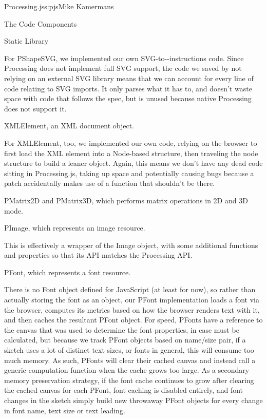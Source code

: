 \begin{aosachapter}{Processing.js}{s:pjs}{Mike Kamermans}
\begin{aosasect1}{The Code Components}
\begin{aosasect2}{Static Library}
\begin{aosaitemize}
For PShapeSVG, we implemented our own
SVG-to--instructions code. Since
Processing does not implement full SVG support, the code we saved by
not relying on an external SVG library means that we can account for
every line of code relating to SVG imports. It only parses what it has
to, and doesn't waste space with code that follows the spec, but is
unused because native Processing does not support it.

\item XMLElement, an XML document object.

For XMLElement, too, we implemented our own code, relying on the
browser to first load the XML element into a Node-based structure,
then traveling the node structure to build a leaner object. Again,
this means we don't have any dead code sitting in Processing.js,
taking up space and potentially causing bugs because a patch
accidentally makes use of a function that shouldn't be there.

\item PMatrix2D and PMatrix3D, which performs matrix operations in 2D and 3D
  mode.

\item PImage, which represents an image resource.

This is effectively a wrapper of the Image object, with some
additional functions and properties so that its API matches the
Processing API.

\item PFont, which represents a font resource.

There is no Font object defined for JavaScript (at least for now), so
rather than actually storing the font as an object, our PFont
implementation loads a font via the browser, computes its metrics
based on how the browser renders text with it, and then caches the
resultant PFont object. For speed, PFonts have a reference to the
canvas that was used to determine the font properties, in case
 must be calculated, but because we track PFont objects based
on name/size pair, if a sketch uses a lot of distinct text sizes, or
fonts in general, this will consume too much memory. As such, PFonts
will clear their cached canvas and instead call a generic 
computation function when the cache grows too large. As a secondary
memory preservation strategy, if the font cache continues to grow
after clearing the cached canvas for each PFont, font caching is
disabled entirely, and font changes in the sketch simply build new
throwaway PFont objects for every change in font name, text size or
text leading.


\end{aosaitemize}
\end{aosasect2}
\end{aosasect1}
\end{aosachapter}
